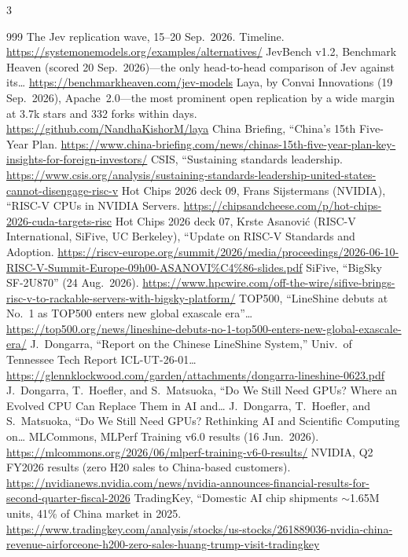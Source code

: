 \begin{multicols}{3}
\begin{thebibliography}{999}
 The Jev replication wave, 15--20 Sep.\ 2026. Timeline. \url{https://systemonemodels.org/examples/alternatives/}
 JevBench v1.2, Benchmark Heaven (scored 20 Sep.\ 2026)---the only head-to-head comparison of Jev against its… \url{https://benchmarkheaven.com/jev-models}
 Laya, by Convai Innovations (19 Sep.\ 2026), Apache~2.0---the most prominent open replication by a wide margin at 3.7k stars and 332 forks within days. \url{https://github.com/NandhaKishorM/laya}
 China Briefing, ``China's 15th Five-Year Plan. \url{https://www.china-briefing.com/news/chinas-15th-five-year-plan-key-insights-for-foreign-investors/}
 CSIS, ``Sustaining standards leadership. \url{https://www.csis.org/analysis/sustaining-standards-leadership-united-states-cannot-disengage-risc-v}
 Hot Chips 2026 deck 09, Frans Sijstermans (NVIDIA), ``RISC-V CPUs in NVIDIA Servers. \url{https://chipsandcheese.com/p/hot-chips-2026-cuda-targets-risc}
 Hot Chips 2026 deck 07, Krste Asanovi\'c (RISC-V International, SiFive, UC Berkeley), ``Update on RISC-V Standards and Adoption. \url{https://riscv-europe.org/summit/2026/media/proceedings/2026-06-10-RISC-V-Summit-Europe-09h00-ASANOVI\%C4\%86-slides.pdf}
 SiFive, ``BigSky SF-2U870'' (24 Aug.\ 2026). \url{https://www.hpcwire.com/off-the-wire/sifive-brings-risc-v-to-rackable-servers-with-bigsky-platform/}
 TOP500, ``LineShine debuts at No.\ 1 as TOP500 enters new global exascale era''… \url{https://top500.org/news/lineshine-debuts-no-1-top500-enters-new-global-exascale-era/}
 J.~Dongarra, ``Report on the Chinese LineShine System,'' Univ.\ of Tennessee Tech Report ICL-UT-26-01… \url{https://glennklockwood.com/garden/attachments/dongarra-lineshine-0623.pdf}
 J.~Dongarra, T.~Hoefler, and S.~Matsuoka, ``Do We Still Need GPUs? Where an Evolved CPU Can Replace Them in AI and…
 J.~Dongarra, T.~Hoefler, and S.~Matsuoka, ``Do We Still Need GPUs? Rethinking AI and Scientific Computing on…
 MLCommons, MLPerf Training v6.0 results (16 Jun.\ 2026). \url{https://mlcommons.org/2026/06/mlperf-training-v6-0-results/}
 NVIDIA, Q2 FY2026 results (zero H20 sales to China-based customers). \url{https://nvidianews.nvidia.com/news/nvidia-announces-financial-results-for-second-quarter-fiscal-2026}
 TradingKey, ``Domestic AI chip shipments $\sim$1.65M units, 41\% of China market in 2025. \url{https://www.tradingkey.com/analysis/stocks/us-stocks/261889036-nvidia-china-revenue-airforceone-h200-zero-sales-huang-trump-visit-tradingkey}

\end{thebibliography}
\end{multicols}

